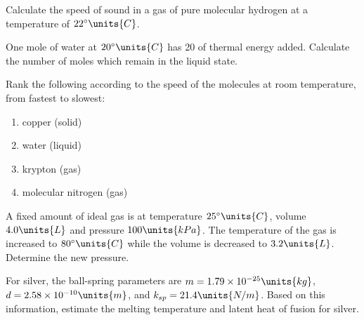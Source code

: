 \begin{problem}
Calculate the speed of sound in a gas of pure molecular hydrogen at a
temperature of $22^\circ\units{C}$.
\label{problem:speed_of_sound}
\end{problem}





\begin{problem}
One mole of water at $20^\circ\units{C}$ has 20 of thermal
energy added.  Calculate the number of moles which remain in the liquid
state.
\end{problem}


\begin{problem}
Rank the following according to the speed of the molecules at room
temperature, from fastest to slowest:
\begin{enumerate}
\item copper (solid)
\item water (liquid)
\item krypton (gas)
\item molecular nitrogen (gas)
\end{enumerate}
\end{problem}


\begin{problem}
A fixed amount of ideal gas is at temperature $25^\circ\units{C}$,
volume $4.0\units{L}$ and pressure $100\units{kPa}$.  The temperature
of the gas is increased to $80^\circ\units{C}$ while the volume is
decreased to $3.2\units{L}$.  Determine the new pressure.
\end{problem}

\begin{problem}
  For silver, the ball-spring parameters are $m=1.79\times
  10^{-25}\units{kg}$, $d=2.58\times 10^{-10}\units{m}$, and
  $k_{sp}=21.4\units{N/m}$.  Based on this information, estimate the
  melting temperature and latent heat of fusion for silver.  
\end{problem}


